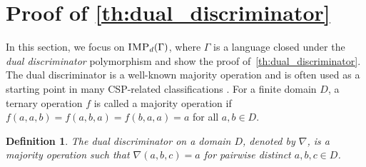 \documentclass[11pt]{article}
\newcommand{\IMP}{\textsc{IMP}}
\newcommand{\1}{\textbf{1}}
\newtheorem{definition}[theorem]{Definition}
\begin{document}
\begin{comment}
\paragraph{Example:} When the domain is $\{0,1,2\}$, the domain polynomial is $(x_i-0)(x_i-1)(x_i-2)=x_i^3-3x_i^2+2x_i$. Thus $\alpha = -3$, $\beta=2$ and $\gamma = 0$ and we are in Case 2 since $k = \alpha^2/4-\beta = 9/4-2>0$.
We choose an integer $d:=3$ so that $d^2k-1>0$. We define (see Case 2 for more details)
\begin{align*}
    &\textrm{constants } b_{\widehat{L}}=1, c_{1_{\widehat{L}}} = 1, c_{2_{\widehat{L}}} = 5/4,\\
    &\textrm{polynomials } p_{1_{\widehat{L}}}=3r_{L'}x_{j'}^2-\frac{9}{2}r_{L'}x_{j'} - \frac{3}{4}r_{L'}, p_{2_{\widehat{L}}}=r_{L'}x_{j'}-\frac{27}{10}r_{L'},\\
    &\quad\quad\quad\quad\quad\quad q^*_{\widehat{L}} = -9r_{L'}^2.
\end{align*}
It follows that 
\begin{align*}
&b_{\widehat{L}}q^*_{\widehat{L}}(x_{j'}^{4}+\alpha x_{j'}^{3} +\beta x_{j'}^2+\gamma x_{j'})+c_{1_{\widehat{L}}}p_{1_{\widehat{L}}}^2+c_{2_{\widehat{L}}}p_{2_{\widehat{L}}}^2
    = -r_{L'}^2 x_{j'}^2 + \frac{387}{40} r_{L'}^2. 
\end{align*}
We add \cref{eq:rL_3el} multiplied by $ \frac{387}{40}$ to the above equation to eliminate the last term and obtain proof of $-(r_{\widehat{L}})^2$.

The proof is nearly the same as the one above: the domain polynomial is now $x_i^4 + \alpha x_i^3 + \beta x_i^2 + \gamma x_i + \delta$. The proof looks similar to \cref{eq:rL_3el}, except that $q_l^*$ is $q_l$. We see that the only additional term is $\delta b_l'q_l$. Adding \cref{eq:rL_3el} multiplied by $-\delta b_l'q_l/r_{L'}^2$ cancels this term out (note that $q_l$ is a multiple of $r_{L'}^2$).
\newpage
\newpage
\end{comment}

\section{Proof of \cref{th:dual_discriminator}}\label{sect:dual-proof}
In this section, we focus on $\IMP_d(\Gamma)$, where $\Gamma$ is a language closed under the \emph{dual discriminator} polymorphism and show the proof of~\cref{th:dual_discriminator}. 
The dual discriminator is a well-known majority operation \cite{Jeavons:1997:CPC,barto_et_al:DFU:2017:6959} and is often used as a starting point in many CSP-related classifications \cite{barto_et_al:DFU:2017:6959}. For a finite domain $D$, a ternary operation $f$ is called a majority operation if  $f(a,a,b)=f(a,b,a)=f(b,a,a)=a$ for all $a,b\in D$. 
\begin{definition}\label{def:dual discriminator}
  The \emph{dual discriminator} on a domain $D$, denoted by $\nabla$, is a majority operation such that $\nabla(a,b,c)=a$ for pairwise distinct $a,b,c\in D$.
\end{definition}
\end{document}
